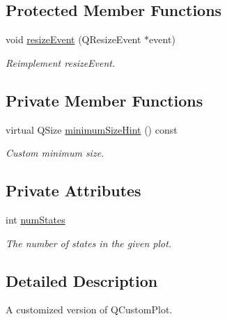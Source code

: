 \subsection*{Protected Member Functions}
\begin{DoxyCompactItemize}
\item 
void \hyperlink{classSGSimulationPlot_a941b3cca099b11618dd16ea9de9ebe91}{resize\+Event} (Q\+Resize\+Event $\ast$event)
\begin{DoxyCompactList}\small\item\em Reimplement resize\+Event. \end{DoxyCompactList}\end{DoxyCompactItemize}
\subsection*{Private Member Functions}
\begin{DoxyCompactItemize}
\item 
\mbox{\label{classSGSimulationPlot_a2e514fdb0e72f5f9acb2bdc3f6811932}} 
virtual Q\+Size \hyperlink{classSGSimulationPlot_a2e514fdb0e72f5f9acb2bdc3f6811932}{minimum\+Size\+Hint} () const
\begin{DoxyCompactList}\small\item\em Custom minimum size. \end{DoxyCompactList}\end{DoxyCompactItemize}
\subsection*{Private Attributes}
\begin{DoxyCompactItemize}
\item 
\mbox{\label{classSGSimulationPlot_adfbb763422b91db7560ebdaa95d646b8}} 
int \hyperlink{classSGSimulationPlot_adfbb763422b91db7560ebdaa95d646b8}{num\+States}
\begin{DoxyCompactList}\small\item\em The number of states in the given plot. \end{DoxyCompactList}\end{DoxyCompactItemize}


\subsection{Detailed Description}
A customized version of Q\+Custom\+Plot. 

